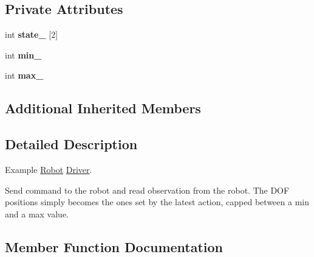 \subsection*{Private Attributes}
\begin{DoxyCompactItemize}
\item 
\mbox{\label{classrobot__interfaces_1_1example_1_1Driver_a86c0ec3574adbdb190ee17c51068b59a}} 
int {\bfseries state\+\_\+} \mbox{[}2\mbox{]}
\item 
\mbox{\label{classrobot__interfaces_1_1example_1_1Driver_a6ffdfed257b3b4466615ec9d4cd7c2d1}} 
int {\bfseries min\+\_\+}
\item 
\mbox{\label{classrobot__interfaces_1_1example_1_1Driver_a3d788870eb3c8043e0f3e278a11b87f6}} 
int {\bfseries max\+\_\+}
\end{DoxyCompactItemize}
\subsection*{Additional Inherited Members}


\subsection{Detailed Description}
Example \hyperlink{classrobot__interfaces_1_1Robot}{Robot} \hyperlink{classrobot__interfaces_1_1example_1_1Driver}{Driver}. 

Send command to the robot and read observation from the robot. The D\+OF positions simply becomes the ones set by the latest action, capped between a min and a max value. 

\subsection{Member Function Documentation}
\mbox{\label{classrobot__interfaces_1_1example_1_1Driver_aa18b1bc90441395e86794a90dfdac9fa}} 
